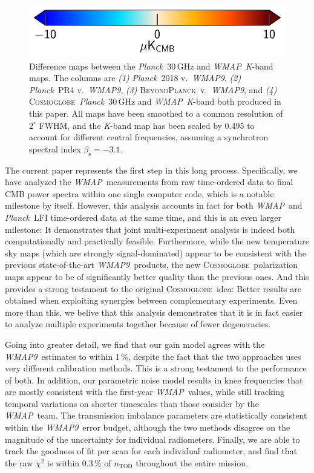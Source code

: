 \documentclass[twocolumn]{../../common/aa}
\def\WMAP{\emph{WMAP}}
\def\WMAPnine{\emph{WMAP9}}
\def\Planck{\emph{Planck}}
\newcommand{\BP}{\textsc{BeyondPlanck}}
\newcommand{\cosmoglobe}{\textsc{Cosmoglobe}}
\newcommand{\K}[0]{\textit K}
\begin{document}
\begin{figure}
        \hspace*{40mm}\includegraphics[width=0.25\textheight]{figures/cbar_10uK.pdf}
	\caption{Difference maps between the \Planck\ 30\,GHz and \WMAP\ \K-band maps. The columns are \textit{(1)} \Planck\ 2018 v.~\WMAPnine, \textit{(2)} \Planck\ PR4 v.~\WMAPnine, \textit{(3)} \BP\ v.~\WMAPnine, and \textit{(4)} \cosmoglobe\ \Planck\ 30\,GHz and \WMAP\ \K-band both produced in this paper. All maps have been smoothed to a common resolution of $2^\circ$ FWHM, and the \K-band map has been scaled by $0.495$ to account for different central frequencies, assuming a synchrotron spectral index $\beta_\mathrm s=-3.1$.}
	\label{fig:diff_history}
\end{figure}

The current paper represents the first step in this long process. Specifically, we have analyzed the \WMAP\ measurements from raw time-ordered data to final CMB power spectra within one single computer code, which is a notable milestone by itself. However, this analysis accounts in fact for both \WMAP\ and \Planck\ LFI time-ordered data at the same time, and this is an even larger milestone: It demonstrates that joint multi-experiment analysis is indeed both computationally and practically feasible. Furthermore, while the new temperature sky maps (which are strongly signal-dominated) appear to be consistent with the previous state-of-the-art \WMAPnine\ products, the new \cosmoglobe\ polarization maps appear to be of significantly better quality than the previous ones. And this provides a strong testament to the original \cosmoglobe\ idea: Better results are obtained when exploiting synergies between complementary experiments. Even more than this, we belive that this analysis demonstrates that it is in fact easier to analyze multiple experiments together because of fewer degeneracies.

Going into greater detail, we find that our gain model agrees with the \WMAPnine\ estimates to within 1\,\%, despite the fact that the two approaches uses very different calibration methods. This is a strong testament to the performance of both. In addition, our parametric noise model results in knee frequencies that are mostly consistent with the first-year \WMAP\ values, while still tracking temporal variations on shorter timescales than those consider by the \WMAP\ team. The transmission imbalance parameters are statistically consistent within the \WMAPnine\ error budget, although the two methods disagree on the magnitude of the uncertainty for individual radiometers. Finally, we are able to track the goodness of fit per scan for each individual radiometer, and find that the raw $\chi^2$ is within 0.3\,\% of $n_\mathrm{TOD}$ throughout the entire mission.
\end{document}
